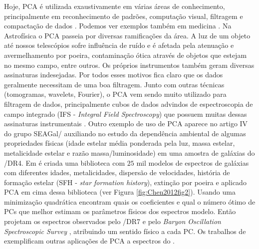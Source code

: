 Hoje, PCA é utilizada exaustivamente em várias áreas de conhecimento, principalmente em reconhecimento de padrões,
computação visual, filtragem e compactação de dados \citep{Kamruzzaman2010, Borcea2012}. Podemos ver exemplos também em
medicina \citep{Balakrishnan2013}. Na Astrofísica o PCA passeia por diversas ramificações da área. A luz de um objeto
até nossos telescópios sofre influência de ruído e é afetada pela atenuação e avermelhamento por poeira, contaminação
ótica através de objetos que estejam no mesmo campo, entre outros. Os próprios instrumentos também geram diversas
assinaturas indesejadas. Por todos esses motivos fica claro que os dados geralmente necessitam de uma boa filtragem.
Junto com outras técnicas (tomogramas, wavelets, Fourier), o PCA vem sendo muito utilizado para filtragem de dados,
principalmente cubos de dados advindos de espectroscopia de campo integrado (IFS - {\em Integral Field Spectroscopy})
que possuem muitas dessas assinaturas instrumentais \citep{Riffel2011}. Outro exemplo de uso de PCA aparece no artigo IV
do grupo SEAGal/\starlight \citep{Mateus2007} auxiliando no estudo da dependência ambiental de algumas propriedades
físicas (idade estelar média ponderada pela luz, massa estelar, metalicidade estelar e razão massa/luminosidade) em uma
amostra de galáxias do \SDSS/DR4. Em \citet{Chen2012} é criada uma biblioteca com $25$ mil modelos de espectros de
galáxias com diferentes idades, metalicidades, dispersão de velocidades, história de formação estelar (SFH - {\em star
formation history}), extinção por poeira e aplicado PCA em cima dessa biblioteca (ver Figura \ref{fig:Chen2012fig2}).
Usando uma minimização quadrática encontram quais os coeficientes e qual o número ótimo de PCs que melhor estimam os
parâmetros físicos dos espectros modelo. Então projetam os espectros observados pelo \SDSS/DR7 \citep{Abazajian2009} e
pelo {\em Baryon Oscillation Spectroscopic Survey} \citep[BOSS;][]{Ahn2012}, atribuindo um sentido físico a cada PC. Os
trabalhos de \citet{Ferreras2006, Wild2006, Rogers2007} exemplificam outras aplicações de PCA a espectros do \SDSS.

